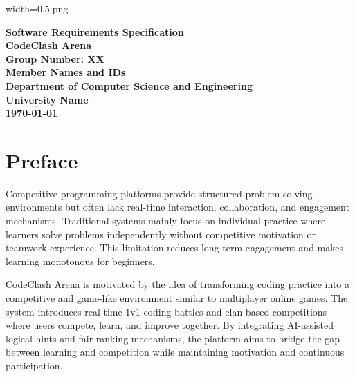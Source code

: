 width=0.5\linewidthimage.png\documentclass[12pt,a4paper]{article}
\begin{document}
\begin{titlepage}
\centering

\vspace*{2cm}

{\Huge \textbf{Software Requirements Specification}}\\[0.5cm]
{\LARGE \textbf{CodeClash Arena}}\\[2cm]

\textbf{Group Number: XX}\\[0.5cm]
\textbf{Member Names and IDs}\\[3cm]

\textbf{Department of Computer Science and Engineering}\\
\textbf{University Name}\\[1cm]

\textbf{\today}

\vfill
\end{titlepage}

\tableofcontents
\newpage

\section{Preface}

Competitive programming platforms provide structured problem-solving environments but often lack real-time interaction, collaboration, and engagement mechanisms. Traditional systems mainly focus on individual practice where learners solve problems independently without competitive motivation or teamwork experience. This limitation reduces long-term engagement and makes learning monotonous for beginners.

CodeClash Arena is motivated by the idea of transforming coding practice into a competitive and game-like environment similar to multiplayer online games. The system introduces real-time 1v1 coding battles and clan-based competitions where users compete, learn, and improve together. By integrating AI-assisted logical hints and fair ranking mechanisms, the platform aims to bridge the gap between learning and competition while maintaining motivation and continuous participation.

\end{document}
